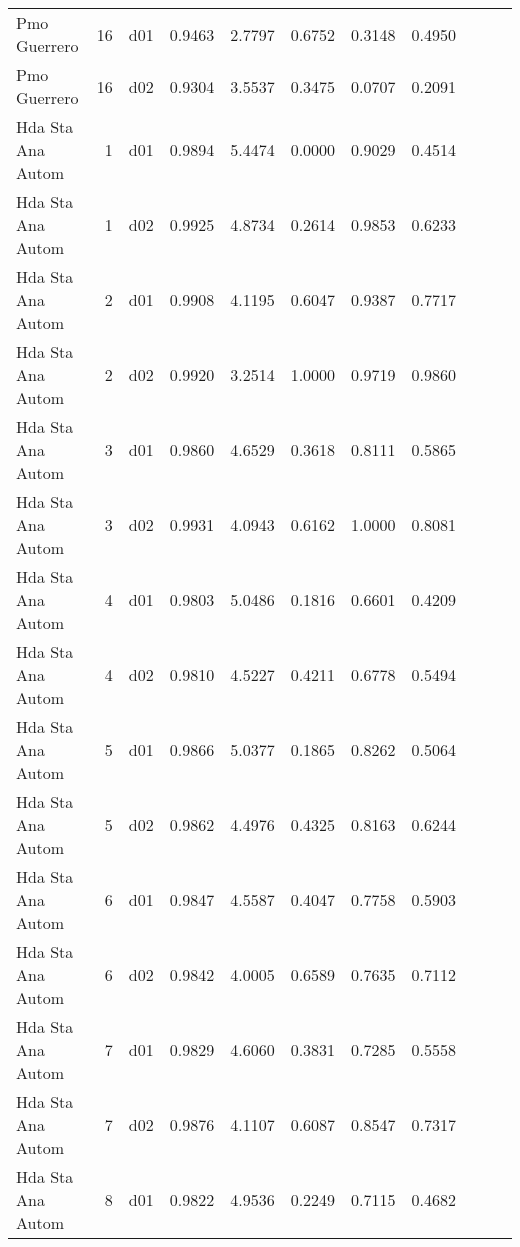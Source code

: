 \begin{landscape}
\begin{longtable}{p{2cm}rrrrrrrrrr}
         Pmo Guerrero  &         16 &     d01 &   0.9463 &  2.7797 &        0.6752 &           0.3148 &  0.4950 \\
         Pmo Guerrero  &         16 &     d02 &   0.9304 &  3.5537 &        0.3475 &           0.0707 &  0.2091 \\
    Hda Sta Ana Autom  &          1 &     d01 &   0.9894 &  5.4474 &        0.0000 &           0.9029 &  0.4514 \\
    Hda Sta Ana Autom  &          1 &     d02 &   0.9925 &  4.8734 &        0.2614 &           0.9853 &  0.6233 \\
    Hda Sta Ana Autom  &          2 &     d01 &   0.9908 &  4.1195 &        0.6047 &           0.9387 &  0.7717 \\
    Hda Sta Ana Autom  &          2 &     d02 &   0.9920 &  3.2514 &        1.0000 &           0.9719 &  0.9860 \\
    Hda Sta Ana Autom  &          3 &     d01 &   0.9860 &  4.6529 &        0.3618 &           0.8111 &  0.5865 \\
    Hda Sta Ana Autom  &          3 &     d02 &   0.9931 &  4.0943 &        0.6162 &           1.0000 &  0.8081 \\
    Hda Sta Ana Autom  &          4 &     d01 &   0.9803 &  5.0486 &        0.1816 &           0.6601 &  0.4209 \\
    Hda Sta Ana Autom  &          4 &     d02 &   0.9810 &  4.5227 &        0.4211 &           0.6778 &  0.5494 \\
    Hda Sta Ana Autom  &          5 &     d01 &   0.9866 &  5.0377 &        0.1865 &           0.8262 &  0.5064 \\
    Hda Sta Ana Autom  &          5 &     d02 &   0.9862 &  4.4976 &        0.4325 &           0.8163 &  0.6244 \\
    Hda Sta Ana Autom  &          6 &     d01 &   0.9847 &  4.5587 &        0.4047 &           0.7758 &  0.5903 \\
    Hda Sta Ana Autom  &          6 &     d02 &   0.9842 &  4.0005 &        0.6589 &           0.7635 &  0.7112 \\
    Hda Sta Ana Autom  &          7 &     d01 &   0.9829 &  4.6060 &        0.3831 &           0.7285 &  0.5558 \\
    Hda Sta Ana Autom  &          7 &     d02 &   0.9876 &  4.1107 &        0.6087 &           0.8547 &  0.7317 \\
    Hda Sta Ana Autom  &          8 &     d01 &   0.9822 &  4.9536 &        0.2249 &           0.7115 &  0.4682 \\

\end{longtable}
\end{landscape}
